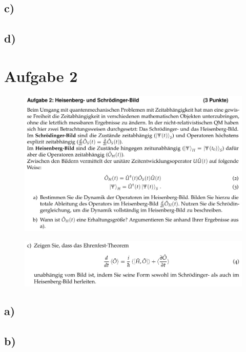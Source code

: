 \subsection{c)}

\subsection{d)}

\section{Aufgabe 2}

    \begin{figure}[H]
        \centering
        \includegraphics[width=\textwidth]{images/Aufgabe2a.jpg}
        \label{fig:2}
    \end{figure}

    \begin{figure}[H]
        \centering
        \includegraphics[width=\textwidth]{images/Aufgabe2b.jpg}
        \label{fig:3}
    \end{figure}

\subsection{a)}

\subsection{b)}


